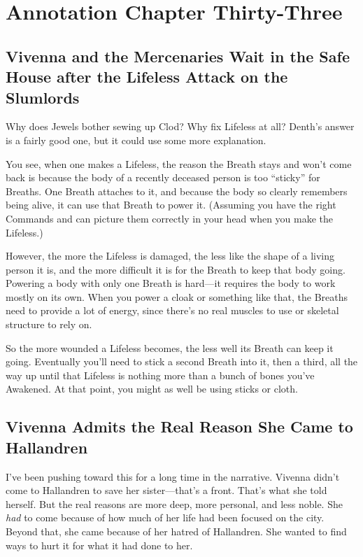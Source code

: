 \section{Annotation Chapter Thirty-Three}

\subsection*{Vivenna and the Mercenaries Wait in the Safe House after the Lifeless Attack on the Slumlords}

Why does Jewels bother sewing up Clod? Why fix Lifeless at all? Denth’s answer is a fairly good one, but it could use some more explanation.

You see, when one makes a Lifeless, the reason the Breath stays and won’t come back is because the body of a recently deceased person is too “sticky” for Breaths. One Breath attaches to it, and because the body so clearly remembers being alive, it can use that Breath to power it. (Assuming you have the right Commands and can picture them correctly in your head when you make the Lifeless.)

However, the more the Lifeless is damaged, the less like the shape of a living person it is, and the more difficult it is for the Breath to keep that body going. Powering a body with only one Breath is hard—it requires the body to work mostly on its own. When you power a cloak or something like that, the Breaths need to provide a lot of energy, since there’s no real muscles to use or skeletal structure to rely on.

So the more wounded a Lifeless becomes, the less well its Breath can keep it going. Eventually you’ll need to stick a second Breath into it, then a third, all the way up until that Lifeless is nothing more than a bunch of bones you’ve Awakened. At that point, you might as well be using sticks or cloth.

\subsection*{Vivenna Admits the Real Reason She Came to Hallandren}

I’ve been pushing toward this for a long time in the narrative. Vivenna didn’t come to Hallandren to save her sister—that’s a front. That’s what she told herself. But the real reasons are more deep, more personal, and less noble. She \textit{had} to come because of how much of her life had been focused on the city. Beyond that, she came because of her hatred of Hallandren. She wanted to find ways to hurt it for what it had done to her.

